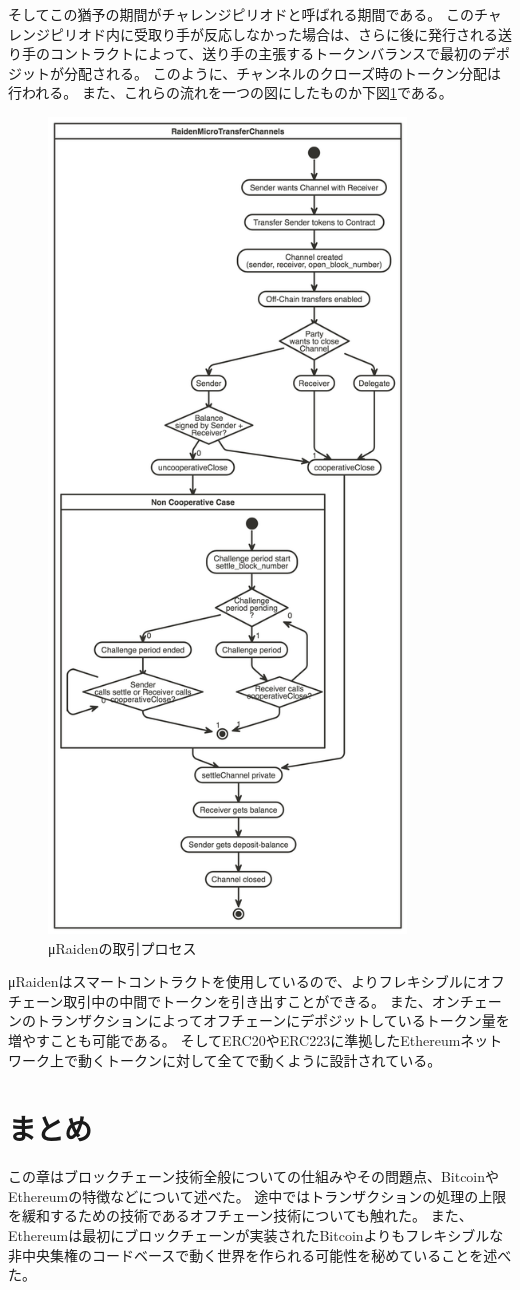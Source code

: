 そしてこの猶予の期間がチャレンジピリオドと呼ばれる期間である。
このチャレンジピリオド内に受取り手が反応しなかった場合は、さらに後に発行される送り手のコントラクトによって、送り手の主張するトークンバランスで最初のデポジットが分配される。
このように、チャンネルのクローズ時のトークン分配は行われる。
また、これらの流れを一つの図にしたものか下図\ref{ChannelCycle}である。
\begin{figure}[htbp]
 \centering
  \includegraphics[width=95mm]{image/ChannelCycle.png}
 \caption{μRaidenの取引プロセス}
 \label{ChannelCycle}
\end{figure}
μRaidenはスマートコントラクトを使用しているので、よりフレキシブルにオフチェーン取引中の中間でトークンを引き出すことができる。
また、オンチェーンのトランザクションによってオフチェーンにデポジットしているトークン量を増やすことも可能である。
そしてERC20やERC223に準拠したEthereumネットワーク上で動くトークンに対して全てで動くように設計されている。

\section{まとめ}
この章はブロックチェーン技術全般についての仕組みやその問題点、BitcoinやEthereumの特徴などについて述べた。
途中ではトランザクションの処理の上限を緩和するための技術であるオフチェーン技術についても触れた。
また、Ethereumは最初にブロックチェーンが実装されたBitcoinよりもフレキシブルな非中央集権のコードベースで動く世界を作られる可能性を秘めていることを述べた。